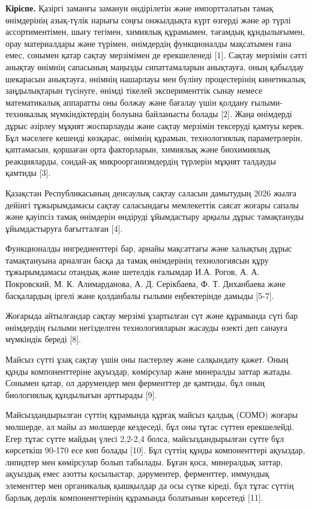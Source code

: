 \begin{multicols}{2}
{\bfseries Кіріспе.} Қазіргі заманғы замануи өндірілетін және импортталатын
тамақ өнімдерінің азық-түлік нарығы соңғы онжылдықта күрт өзгерді және
әр түрлі ассортиментімен, шығу тегімен, химиялық құрамымен, тағамдық
құндылығымен, орау материалдары және түрімен, өнімдердің функционалды
мақсатымен ғана емес, сонымен қатар сақтау мерзімімен де ерекшеленеді
{[}1{]}. Сақтау мерзімін сәтті анықтау өнімнің сапасының маңызды
сипаттамаларын анықтауға, оның қабылдау шекарасын анықтауға, өнімнің
нашарлауы мен бүліну процестерінің кинетикалық заңдылықтарын түсінуге,
өнімді тікелей эксперименттік сынау немесе математикалық аппаратты оны
болжау және бағалау үшін қолдану ғылыми-техникалық мүмкіндіктердің
болуына байланысты болады {[}2{]}. Жаңа өнімдерді дұрыс әзірлеу мұқият
жоспарлауды және сақтау мерзімін тексеруді қамтуы керек. Бұл мәселеге
кешенді көзқарас, өнімнің құрамын, технологиялық параметрлерін,
қаптамасын, қоршаған орта факторларын, химиялық және биохимиялық
реакцияларды, сондай-ақ микроорганизмдердің түрлерін мұқият талдауды
қамтиды {[}3{]}.

Қазақстан Республикасының денсаулық сақтау саласын дамытудың 2026 жылға
дейінгі тұжырымдамасы сақтау саласындағы мемлекеттік саясат жоғары
сапалы және қауіпсіз тамақ өнімдерін өндіруді ұйымдастыру арқылы дұрыс
тамақтануды ұйымдастыруға бағытталған {[}4{]}.

Функционалды ингредиенттері бар, арнайы мақсаттағы және халықтың дұрыс
тамақтануына арналған басқа да тамақ өнімдерінің технологиясын құру
тұжырымдамасы отандық және шетелдік ғалымдар И.А. Рогов, А. А.
Покровский, М. К. Алимарданова, А. Д. Серікбаева, Ф. Т. Диханбаева және
басқалардың іргелі және қолданбалы ғылыми еңбектерінде дамыды {[}5-7{]}.

Жоғарыда айтылғандар сақтау мерзімі ұзартылған сүт және құрамында сүті
бар өнімдердің ғылыми негізделген технологияларын жасауды өзекті деп
санауға мүмкіндік береді {[}8{]}.

Майсыз сүтті ұзақ сақтау үшін оны пастерлеу және салқындату қажет. Оның
құнды компоненттеріне ақуыздар, көмірсулар және минералды заттар жатады.
Сонымен қатар, ол дәрумендер мен ферменттер де қамтиды, бұл оның
биологиялық құндылығын арттырады {[}9{]}.

Майсыздандырылған сүттің құрамында құрғақ майсыз қалдық (СОМО) жоғары
мөлшерде, ал майы аз мөлшерде кездеседі, бұл оны тұтас сүттен
ерекшелейді. Егер тұтас сүтте майдың үлесі 2,2-2,4 болса,
майсыздандырылған сүтте бұл көрсеткіш 90-170 есе көп болады {[}10{]}.
Бұл сүттің құнды компоненттері ақуыздар, липидтер мен көмірсулар болып
табылады. Бұған қоса, минералдық заттар, ақуыздық емес азотты
қосылыстар, дәрументер, ферменттер, иммундық элементтер мен органикалық
қышқылдар да осы сүтке кіреді, бұл тұтас сүттің барлық дерлік
компоненттерінің құрамында болатынын көрсетеді {[}11{]}.


\end{multicols}
